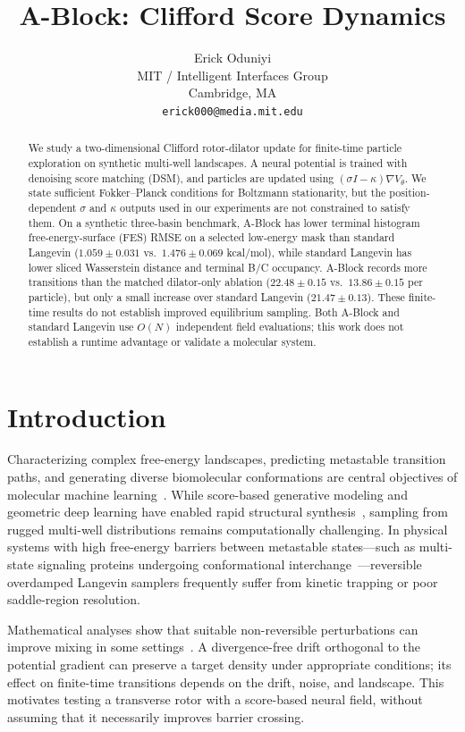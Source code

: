 \documentclass{article}
\title{A-Block: Clifford Score Dynamics}
\author{%
  Erick Oduniyi\\
  MIT / Intelligent Interfaces Group\\
  Cambridge, MA\\
  \texttt{erick000@media.mit.edu}\\
}
\begin{document}
\maketitle

\begin{abstract}
We study a two-dimensional Clifford rotor-dilator update for finite-time particle exploration on synthetic multi-well landscapes. A neural potential is trained with denoising score matching (DSM), and particles are updated using $(\sigma I-\kappa)\nabla V_\theta$. We state sufficient Fokker--Planck conditions for Boltzmann stationarity, but the position-dependent $\sigma$ and $\kappa$ outputs used in our experiments are not constrained to satisfy them. On a synthetic three-basin benchmark, A-Block has lower terminal histogram free-energy-surface (FES) RMSE on a selected low-energy mask than standard Langevin ($1.059\pm0.031$ vs.\ $1.476\pm0.069$ kcal/mol), while standard Langevin has lower sliced Wasserstein distance and terminal B/C occupancy. A-Block records more transitions than the matched dilator-only ablation ($22.48\pm0.15$ vs.\ $13.86\pm0.15$ per particle), but only a small increase over standard Langevin ($21.47\pm0.13$). These finite-time results do not establish improved equilibrium sampling. Both A-Block and standard Langevin use $O(N)$ independent field evaluations; this work does not establish a runtime advantage or validate a molecular system.
\end{abstract}

\section{Introduction}

Characterizing complex free-energy landscapes, predicting metastable transition paths, and generating diverse biomolecular conformations are central objectives of molecular machine learning~\citep{noe2019boltzmann, hoogeboom2022equivariant, du2022molgen}. While score-based generative modeling and geometric deep learning have enabled rapid structural synthesis~\citep{bronstein2021geometric, song2020score}, sampling from rugged multi-well distributions remains computationally challenging. In physical systems with high free-energy barriers between metastable states—such as multi-state signaling proteins undergoing conformational interchange~\citep{devore2016single}—reversible overdamped Langevin samplers frequently suffer from kinetic trapping or poor saddle-region resolution.

Mathematical analyses show that suitable non-reversible perturbations can improve mixing in some settings~\citep{hwang2005accelerating, lelievre2013optimal, duncan2016variance}. A divergence-free drift orthogonal to the potential gradient can preserve a target density under appropriate conditions; its effect on finite-time transitions depends on the drift, noise, and landscape. This motivates testing a transverse rotor with a score-based neural field, without assuming that it necessarily improves barrier crossing.
\end{document}
